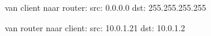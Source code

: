 van client naar router:
src: 0.0.0.0
dst: 255.255.255.255


van router naar client:
src: 10.0.1.21
dst: 10.0.1.2